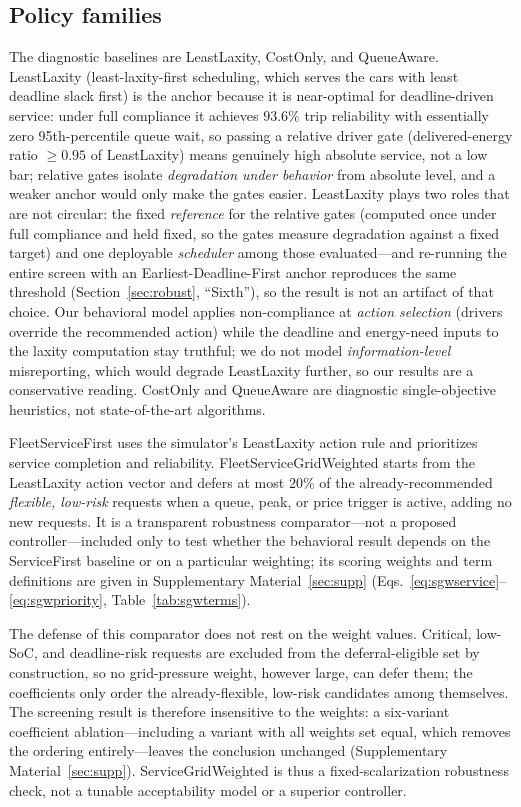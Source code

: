 \documentclass[12pt]{article}
\begin{document}
\subsection{Policy families}

The diagnostic baselines are LeastLaxity, CostOnly, and QueueAware. LeastLaxity (least-laxity-first scheduling, which serves the cars with least deadline slack first) is the anchor because it is near-optimal for deadline-driven service: under full compliance it achieves $93.6\%$ trip reliability with essentially zero 95th-percentile queue wait, so passing a relative driver gate (delivered-energy ratio $\geq0.95$ of LeastLaxity) means genuinely high absolute service, not a low bar; relative gates isolate \emph{degradation under behavior} from absolute level, and a weaker anchor would only make the gates easier. LeastLaxity plays two roles that are not circular: the fixed \emph{reference} for the relative gates (computed once under full compliance and held fixed, so the gates measure degradation against a fixed target) and one deployable \emph{scheduler} among those evaluated---and re-running the entire screen with an Earliest-Deadline-First anchor reproduces the same threshold (Section~\ref{sec:robust}, ``Sixth''), so the result is not an artifact of that choice. Our behavioral model applies non-compliance at \emph{action selection} (drivers override the recommended action) while the deadline and energy-need inputs to the laxity computation stay truthful; we do not model \emph{information-level} misreporting, which would degrade LeastLaxity further, so our results are a conservative reading. CostOnly and QueueAware are diagnostic single-objective heuristics, not state-of-the-art algorithms.

FleetServiceFirst uses the simulator's LeastLaxity action rule and prioritizes service completion and reliability. FleetServiceGridWeighted starts from the LeastLaxity action vector and defers at most $20\%$ of the already-recommended \emph{flexible, low-risk} requests when a queue, peak, or price trigger is active, adding no new requests. It is a transparent robustness comparator---not a proposed controller---included only to test whether the behavioral result depends on the ServiceFirst baseline or on a particular weighting; its scoring weights and term definitions are given in Supplementary Material~\ref{sec:supp} (Eqs.~\eqref{eq:sgwservice}--\eqref{eq:sgwpriority}, Table~\ref{tab:sgwterms}).

The defense of this comparator does not rest on the weight values. Critical, low-SoC, and deadline-risk requests are excluded from the deferral-eligible set by construction, so no grid-pressure weight, however large, can defer them; the coefficients only order the already-flexible, low-risk candidates among themselves. The screening result is therefore insensitive to the weights: a six-variant coefficient ablation---including a variant with all weights set equal, which removes the ordering entirely---leaves the conclusion unchanged (Supplementary Material~\ref{sec:supp}). ServiceGridWeighted is thus a fixed-scalarization robustness check, not a tunable acceptability model or a superior controller.
\end{document}
